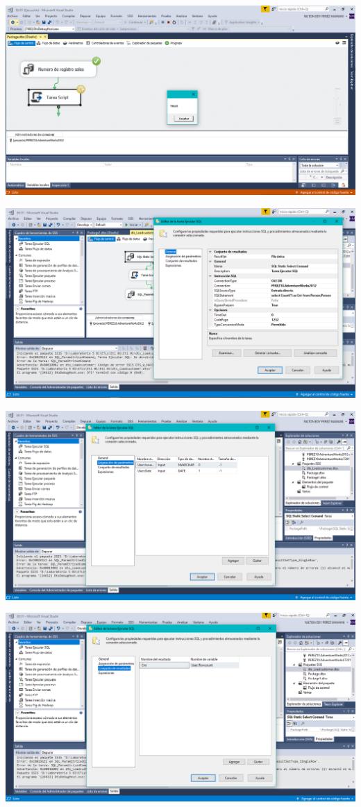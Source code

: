 {\begin{center}
\includegraphics[width=15cm]{./Imagenes/imagen22}
\end{center}
\begin{center}
\includegraphics[width=15cm]{./Imagenes/imagen23}
\end{center}
\begin{center}
\includegraphics[width=15cm]{./Imagenes/imagen24}
\end{center}
\begin{center}
\includegraphics[width=15cm]{./Imagenes/imagen25}

\end{center}}
